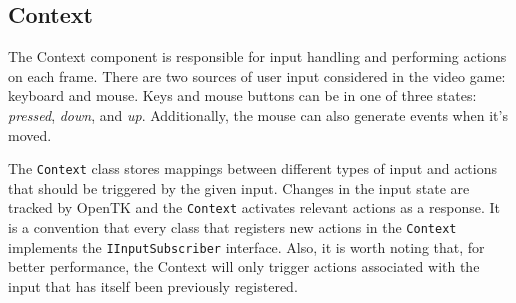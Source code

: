 \subsection{Context}

The Context component is responsible for input handling and performing actions on each frame.
There are two sources of user input considered in the video game: keyboard and mouse.
Keys and mouse buttons can be in one of three states: \textit{pressed}, \textit{down}, and \textit{up}.
Additionally, the mouse can also generate events when it's moved.

The \texttt{Context} class stores mappings between different types of input and actions that should be triggered by the given input.
Changes in the input state are tracked by OpenTK and the \texttt{Context} activates relevant actions as a response.
It is a convention that every class that registers new actions in the \texttt{Context} implements the \texttt{IInputSubscriber} interface.
Also, it is worth noting that, for better performance, the Context will only trigger actions associated with the input that has itself been previously registered.